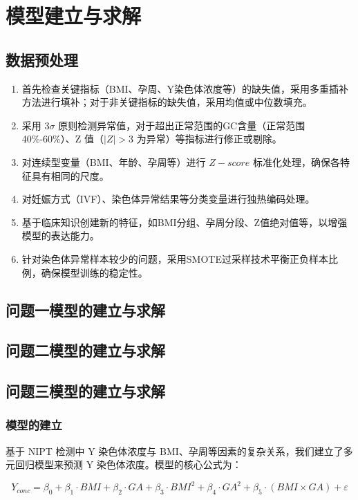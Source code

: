 \documentclass[withoutpreface,bwprint]{cumcmthesis} %
\begin{document}
\section{模型建立与求解}
\subsection{数据预处理}
\begin{enumerate}
    \item 首先检查关键指标（BMI、孕周、Y染色体浓度等）的缺失值，采用多重插补方法进行填补；对于非关键指标的缺失值，采用均值或中位数填充。
    \item 采用 $3\sigma$ 原则检测异常值，对于超出正常范围的GC含量（正常范围 40\%-60\%）、Z 值（$\vert Z\vert>3$ 为异常）等指标进行修正或剔除。
    \item 对连续型变量（BMI、年龄、孕周等）进行 $Z-score$ 标准化处理，确保各特征具有相同的尺度。
    \item 对妊娠方式（IVF）、染色体异常结果等分类变量进行独热编码处理。
    \item 基于临床知识创建新的特征，如BMI分组、孕周分段、Z值绝对值等，以增强模型的表达能力。
    \item 针对染色体异常样本较少的问题，采用SMOTE过采样技术平衡正负样本比例，确保模型训练的稳定性。
\end{enumerate}

\subsection{问题一模型的建立与求解}

\subsection{问题二模型的建立与求解}

\subsection{问题三模型的建立与求解}
\subsubsection{模型的建立}
基于 NIPT 检测中 Y 染色体浓度与 BMI、孕周等因素的复杂关系，我们建立了多元回归模型来预测 Y 染色体浓度。模型的核心公式为：

$$Y_{conc} = \beta_0 + \beta_1 \cdot BMI + \beta_2 \cdot GA + \beta_3 \cdot BMI^2 + \beta_4 \cdot GA^2 + \beta_5 \cdot (BMI \times GA) + \varepsilon$$
\end{document}
